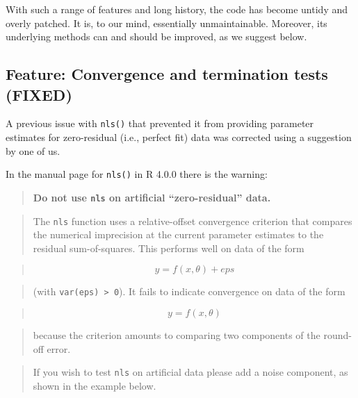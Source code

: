 With such a range of features and long history, the code has become untidy
and overly patched. It is, to
our mind, essentially unmaintainable. Moreover, its underlying methods can and
should be improved, as we suggest below.

\hypertarget{feature-convergence-and-termination-tests-fixed}{%
\subsection{Feature: Convergence and termination tests (FIXED)}\label{feature-convergence-and-termination-tests-fixed}}

A previous issue with \texttt{nls()} that prevented it from providing parameter
estimates for zero-residual
(i.e., perfect fit) data was corrected using a suggestion by one of us.

In the manual page for \texttt{nls()} in R 4.0.0 there is the warning:

\begin{quote}
\textbf{Do not use \texttt{nls} on artificial ``zero-residual'' data.}
\end{quote}

\begin{quote}
The \texttt{nls} function uses a relative-offset convergence criterion
that compares the numerical imprecision at the current parameter
estimates to the residual sum-of-squares. This performs well on data of
the form
\end{quote}

\begin{quote}
\[  y = f(x, \theta) + eps \]
\end{quote}

\begin{quote}
(with \texttt{var(eps)\ \textgreater{}\ 0}). It fails to indicate convergence on data of the form
\end{quote}

\begin{quote}
\[  y = f(x, \theta)  \]
\end{quote}

\begin{quote}
because the criterion amounts to comparing two components of the round-off
error.
\end{quote}

\begin{quote}
If you wish to test \texttt{nls} on artificial data please add a noise component,
as shown in the example below.
\end{quote}

